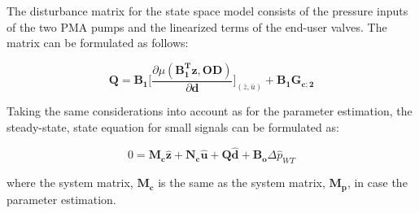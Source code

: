 The disturbance matrix for the state space model consists of the pressure inputs of the two PMA pumps and the linearized terms of the end-user valves. The matrix can be formulated as follows: 

\begin{equation}
  \pmb{Q} = \pmb{B_1} \bigg[ \frac{\partial{\mu(\pmb{{B_1^{T}}}\pmb{z}, \pmb{OD})}}{{\partial{\pmb{d}}}}  \bigg]_{(\bar{z}, \bar{u})} + \pmb{B_1}\pmb{G_{c;2}}  
\label{disturbance_matrix}
\end{equation}

Taking the same considerations into account as for the parameter estimation, the steady-state, state equation for small signals can be formulated as: 

 \begin{equation}
 0 = \pmb{M_c} \pmb{\hat{z}} + \pmb{N_c} \pmb{\hat{u}} + \pmb{Q} \pmb{\hat{d}} + \pmb{B_o} \Delta \hat{p}_{WT}    
 \label{statespace_control_sys}
\end{equation}

where the system matrix, $\pmb{M_c}$ is the same as the system matrix, $\pmb{M_p}$, in case the parameter estimation. 